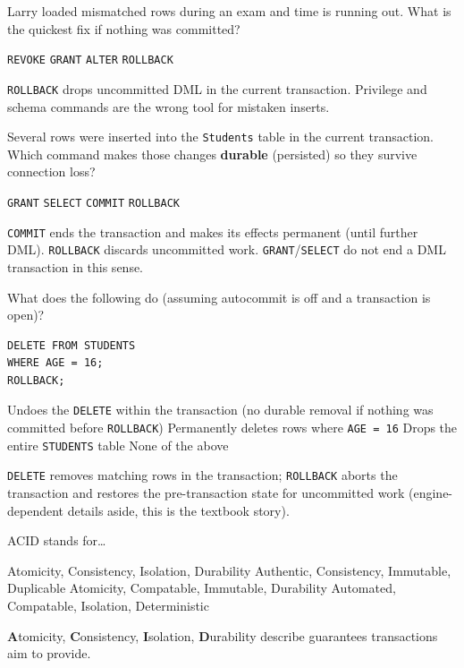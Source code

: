 \question[4]
Larry loaded mismatched rows during an exam and time is running out. What is the quickest fix if nothing was committed?
\begin{choices}
  \choice \texttt{REVOKE}
  \choice \texttt{GRANT}
  \choice \texttt{ALTER}
  \CorrectChoice \texttt{ROLLBACK}
\end{choices}
\begin{solution}
  \texttt{ROLLBACK} drops uncommitted DML in the current transaction. Privilege and schema commands are the wrong tool for mistaken inserts.
\end{solution}

\newpage 


\question[4]
Several rows were inserted into the \texttt{Students} table in the current transaction. Which command makes those changes \textbf{durable} (persisted) so they survive connection loss?
\begin{choices}
  \choice \texttt{GRANT}
  \choice \texttt{SELECT}
  \CorrectChoice \texttt{COMMIT}
  \choice \texttt{ROLLBACK}
\end{choices}
\begin{solution}
  \texttt{COMMIT} ends the transaction and makes its effects permanent (until further DML). \texttt{ROLLBACK} discards uncommitted work. \texttt{GRANT}/\texttt{SELECT} do not end a DML transaction in this sense.
\end{solution}

\question[4]
What does the following do (assuming autocommit is off and a transaction is open)?
\begin{lstlisting}[style=sqlexam]
DELETE FROM STUDENTS
WHERE AGE = 16;
ROLLBACK;
\end{lstlisting}
\begin{choices}
  \CorrectChoice Undoes the \texttt{DELETE} within the transaction (no durable removal if nothing was committed before \texttt{ROLLBACK})
  \choice Permanently deletes rows where \texttt{AGE = 16}
  \choice Drops the entire \texttt{STUDENTS} table
  \choice None of the above
\end{choices}
\begin{solution}
  \texttt{DELETE} removes matching rows in the transaction; \texttt{ROLLBACK} aborts the transaction and restores the pre-transaction state for uncommitted work (engine-dependent details aside, this is the textbook story).
\end{solution}

\question[4]
ACID stands for\ldots
\begin{choices}
  \CorrectChoice Atomicity, Consistency, Isolation, Durability
  \choice Authentic, Consistency, Immutable, Duplicable
  \choice Atomicity, Compatable, Immutable, Durability
  \choice Automated, Compatable, Isolation, Deterministic
\end{choices}
\begin{solution}
  \textbf{A}tomicity, \textbf{C}onsistency, \textbf{I}solation, \textbf{D}urability describe guarantees transactions aim to provide.
\end{solution}

